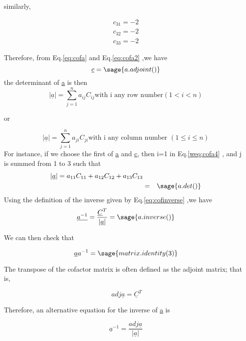 \documentclass[12pt]{report}
\newcommand{\lab}[1]{
Eq.\ref{#1}
}
\begin{document}
similarly,

\begin{eqnarray} c_{31} = -2 \\ c_{32} = -2  \\c_{33} = -2 \label{eq:cofa2}\end{eqnarray}

Therefore, from \lab{eq:cofa} and \lab{eq:cofa2} ,we have 
\begin{equation} \underline{c} = \sage{a.adjoint()}\end{equation}
the determinant of \underline{a} is then 
\begin{equation}{|\underline{a}|}=\sum_{j=1}^{n}a_{ij}C_{ij} \text{with i any row
number} (1 < i < n) \label{weq:cofa4}\end{equation}


or


\begin{equation}{|\underline{a}|}=\sum_{j=1}^{n}a_{ji}C_{ji} \text{with i any column
number }(1\leq i\leq n) \end{equation} 
For instance, if we choose the first of \underline{a} and \underline{c}, then i=1
in \lab{weq:cofa4}, and j is summed from 1 to 3 such that
\begin{eqnarray}|\underline{a}|=a_{11}C_{11}+a_{12}C_{12}+a_{13}C_{13} \nonumber \\ & = & \sage{a.det()}\end{eqnarray}
Using the definition of the inverse given by \lab{eq:cofinverse},we have
\begin{equation} \underline{a^{-1}}=\frac{\underline{C}^T}{|\underline{a}|}=\sage{a.inverse()} \end{equation}

We can then check that

\begin{equation}\underline{a}{a}^{-1}=\sage{matrix.identity(3)}\end{equation}


The transpose of the cofactor matrix is often defined as the adjoint
matrix; that is,

\begin{equation}\ adj\underline{a}=\underline{C}^T \end{equation}

Therefore, an alternative equation for the inverse of \underline{a} is


\begin{equation}\underline{a}^{-1}=\frac {adj \underline{a}}{|\underline{a}|}\end{equation}
\end{document}
